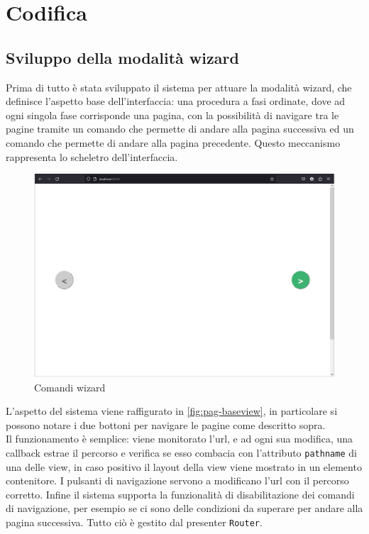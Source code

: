 \section{Codifica}

\subsection{Sviluppo della modalità wizard}

Prima di tutto è stata sviluppato il sistema per attuare la modalità wizard, che definisce l'aspetto base dell'interfaccia: una procedura a fasi ordinate, dove ad ogni singola fase corrisponde una pagina, con la possibilità di navigare tra le pagine tramite un comando che permette di andare alla pagina successiva ed un comando che permette di andare alla pagina precedente. Questo meccanismo rappresenta lo scheletro dell'interfaccia.

\begin{figure}[H] 
    \centering 
    \includegraphics[width=0.8\columnwidth]{immagini/pag-baseview.png} 
    \caption{Comandi wizard}
    \label{fig:pag-baseview}
\end{figure}

L'aspetto del sistema viene raffigurato in \autoref{fig:pag-baseview}, in particolare si possono notare i due bottoni per navigare le pagine come descritto sopra.
\\
Il funzionamento è semplice: viene monitorato l'url, e ad ogni sua modifica, una callback estrae il percorso e verifica se esso combacia con l'attributo \texttt{pathname} di una delle view, in caso positivo il layout della view viene mostrato in un elemento contenitore. I pulsanti di navigazione servono a modificano l'url con il percorso corretto.
Infine il sistema supporta la funzionalità di disabilitazione dei comandi di navigazione, per esempio se ci sono delle condizioni da superare per andare alla pagina successiva. Tutto ciò è gestito dal presenter \texttt{Router}.

